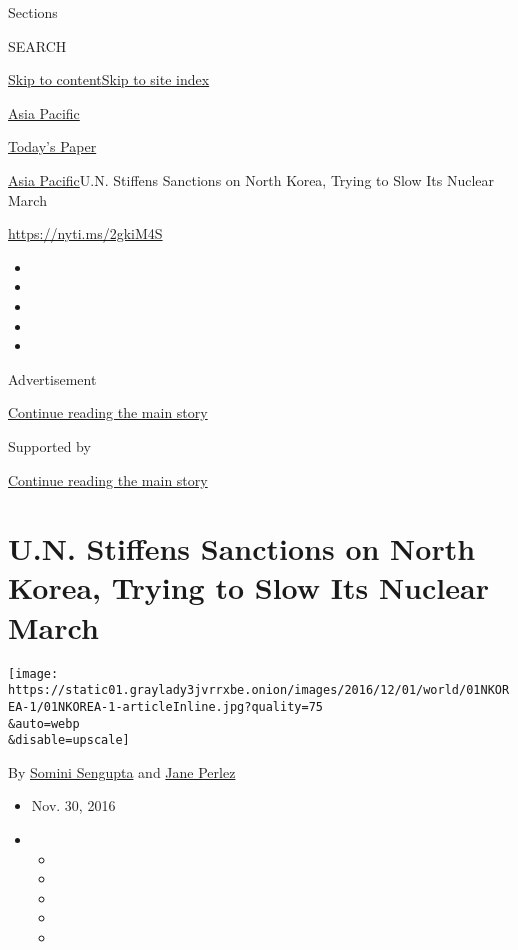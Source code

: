 Sections

SEARCH

\protect\hyperlink{site-content}{Skip to
content}\protect\hyperlink{site-index}{Skip to site index}

\href{https://www.nytimes3xbfgragh.onion/section/world/asia}{Asia
Pacific}

\href{https://myaccount.nytimes3xbfgragh.onion/auth/login?response_type=cookie\&client_id=vi}{}

\href{https://www.nytimes3xbfgragh.onion/section/todayspaper}{Today's
Paper}

\href{/section/world/asia}{Asia Pacific}\textbar{}U.N. Stiffens
Sanctions on North Korea, Trying to Slow Its Nuclear March

\url{https://nyti.ms/2gkiM4S}

\begin{itemize}
\item
\item
\item
\item
\item
\end{itemize}

Advertisement

\protect\hyperlink{after-top}{Continue reading the main story}

Supported by

\protect\hyperlink{after-sponsor}{Continue reading the main story}

\hypertarget{un-stiffens-sanctions-on-north-korea-trying-to-slow-its-nuclear-march}{%
\section{U.N. Stiffens Sanctions on North Korea, Trying to Slow Its
Nuclear
March}\label{un-stiffens-sanctions-on-north-korea-trying-to-slow-its-nuclear-march}}

\texttt{[image: https://static01.graylady3jvrrxbe.onion/images/2016/12/01/world/01NKOREA-1/01NKOREA-1-articleInline.jpg?quality=75\\\&auto=webp\\\&disable=upscale]}

By \href{http://www.nytimes3xbfgragh.onion/by/somini-sengupta}{Somini
Sengupta} and
\href{http://www.nytimes3xbfgragh.onion/by/jane-perlez}{Jane Perlez}

\begin{itemize}
\item
  Nov. 30, 2016
\item
  \begin{itemize}
  \item
  \item
  \item
  \item
  \item
  \end{itemize}
\end{itemize}

